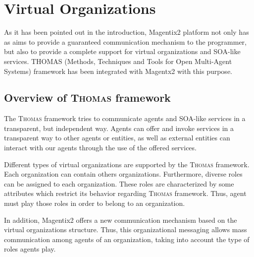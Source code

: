 \chapter{Virtual Organizations}\label{chap:VirtualOrganizations}
As it has been pointed out in the introduction, Magentix2 platform not only has as aims to provide a guaranteed communication mechanism to the programmer, but also to provide a complete support for virtual organizations and SOA-like services. \textsc{THOMAS} (Methods, Techniques and Tools for Open Multi-Agent Systems) framework has been integrated with Magentx2 with this purpose.

\section{Overview of \textsc{Thomas} framework}

The \textsc{Thomas} framework tries to communicate agents and SOA-like services in a transparent, but independent way.  Agents can offer and invoke services in a transparent way to other agents or entities, as well as external entities can interact with our agents through the use of the offered services.


Different types of virtual organizations are supported by the \textsc{Thomas} framework. Each organization can contain others organizations. Furthermore, diverse roles can be assigned to each organization. These roles are characterized by some attributes which restrict its behavior regarding \textsc{Thomas} framework. Thus, agent must play those roles in order to belong to an organization.

In addition, Magentix2 offers a new communication mechanism based on the virtual organizations structure. Thus, this organizational messaging allows mass communication among agents of an organization, taking into account the type of roles agents play.

